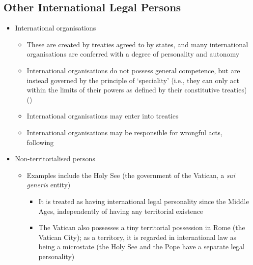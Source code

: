 \subsection{Other International Legal Persons}
\begin{itemize}
    \item International organisations
    \begin{itemize}
        \item These are created by treaties agreed to by states, and many international organisations are conferred with a degree of personality and autonomy
        \item International organisations do not possess general competence, but are instead governed by the principle of `speciality' (i.e., they can only act within the limits of their powers as defined by their constitutive treaties) ()
        \item International organisations may enter into treaties
        \item International organisations may be responsible for wrongful acts, following 
    \end{itemize}
    \item Non-territorialised persons
    \begin{itemize}
        \item Examples include the Holy See (the government of the Vatican, a \textit{sui generis} entity)
        \begin{itemize}
            \item It is treated as having international legal personality since the Middle Ages, independently of having any territorial existence
            \item The Vatican also possesses a tiny territorial possession in Rome (the Vatican City); as a territory, it is regarded in international law as being a microstate (the Holy See and the Pope have a separate legal personality)
        \end{itemize}
    \end{itemize}
\end{itemize}

